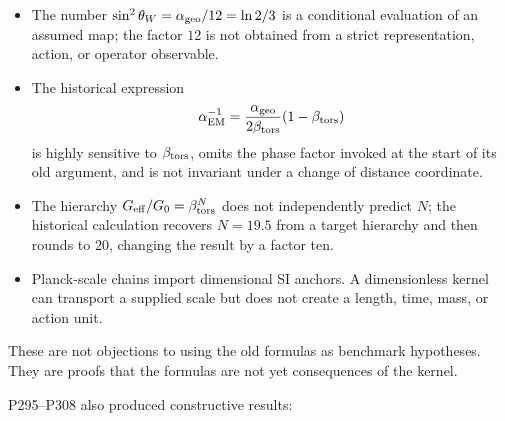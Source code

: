 \documentclass[11pt,a4paper,openany]{report}
\begin{document}
\begin{itemize}
\item 
The number \(\sin^2\theta_W=\alpha_{\rm geo}/12=\ln2/3\) is a conditional evaluation of an assumed map; the factor \(12\) is not obtained from a strict representation, action, or operator observable.

\item 
The historical expression \[
  \alpha_{\rm EM}^{-1}
  =
  \frac{\alpha_{\rm geo}}{2\beta_{\rm tors}}
  (1-\beta_{\rm tors})
  \] is highly sensitive to \(\beta_{\rm tors}\), omits the phase factor invoked at the start of its old argument, and is not invariant under a change of distance coordinate.

\item 
The hierarchy \(G_{\rm eff}/G_0=\beta_{\rm tors}^N\) does not independently predict \(N\); the historical calculation recovers \(N=19.5\) from a target hierarchy and then rounds to \(20\), changing the result by a factor ten.

\item 
Planck-scale chains import dimensional SI anchors. A dimensionless kernel can transport a supplied scale but does not create a length, time, mass, or action unit.

\end{itemize}

These are not objections to using the old formulas as benchmark hypotheses. They are proofs that the formulas are not yet consequences of the kernel.

P295--P308 also produced constructive results:
\end{document}
